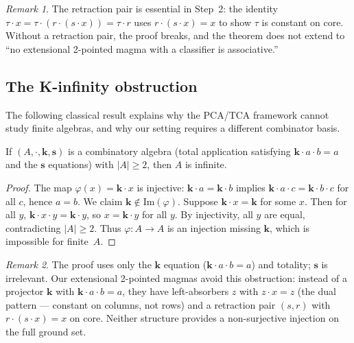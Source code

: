 \documentclass[sigconf,screen]{acmart}
\newcommand{\dotop}{\cdot}
\theoremstyle{remark}
\newtheorem{remark}{Remark}
\begin{document}
\begin{remark}
The retraction pair is essential in Step~2: the identity $\tau \dotop x = \tau \dotop (r \dotop (s \dotop x)) = \tau \dotop r$ uses $r \dotop (s \dotop x) = x$ to show $\tau$ is constant on core. Without a retraction pair, the proof breaks, and the theorem does not extend to ``no extensional 2-pointed magma with a classifier is associative.''
\end{remark}

\subsection{The K-infinity obstruction}

The following classical result explains why the PCA/TCA framework cannot study finite algebras, and why our setting requires a different combinator basis.

\begin{theorem}[K-infinity]
\label{thm:k-infinity}
If $(A, \dotop, \mathbf{k}, \mathbf{s})$ is a combinatory algebra (total application satisfying $\mathbf{k} \dotop a \dotop b = a$ and the $\mathbf{s}$ equations) with $|A| \geq 2$, then $A$ is infinite.
\end{theorem}

\begin{proof}
The map $\varphi(x) = \mathbf{k} \dotop x$ is injective: $\mathbf{k} \dotop a = \mathbf{k} \dotop b$ implies $\mathbf{k} \dotop a \dotop c = \mathbf{k} \dotop b \dotop c$ for all $c$, hence $a = b$. We claim $\mathbf{k} \notin \mathrm{Im}(\varphi)$. Suppose $\mathbf{k} \dotop x = \mathbf{k}$ for some $x$. Then for all $y$, $\mathbf{k} \dotop x \dotop y = \mathbf{k} \dotop y$, so $x = \mathbf{k} \dotop y$ for all $y$. By injectivity, all $y$ are equal, contradicting $|A| \geq 2$. Thus $\varphi : A \to A$ is an injection missing $\mathbf{k}$, which is impossible for finite~$A$.
\end{proof}

\begin{remark}
The proof uses only the $\mathbf{k}$ equation ($\mathbf{k} \dotop a \dotop b = a$) and totality; $\mathbf{s}$ is irrelevant. Our extensional 2-pointed magmas avoid this obstruction: instead of a projector $\mathbf{k}$ with $\mathbf{k} \dotop a \dotop b = a$, they have left-absorbers $z$ with $z \dotop x = z$ (the dual pattern --- constant on columns, not rows) and a retraction pair $(s, r)$ with $r \dotop (s \dotop x) = x$ on core. Neither structure provides a non-surjective injection on the full ground set.
\end{remark}
\end{document}
